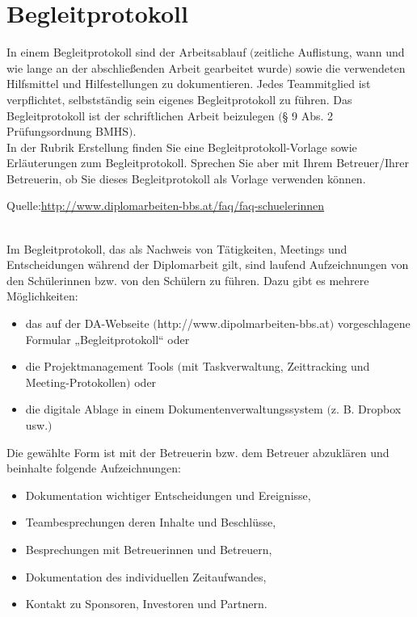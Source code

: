 
\chapter{Begleitprotokoll}
In einem Begleitprotokoll sind der Arbeitsablauf $($zeitliche Auflistung, wann und wie lange an der abschließenden Arbeit gearbeitet wurde$)$ sowie die verwendeten Hilfsmittel und Hilfestellungen zu dokumentieren. Jedes Teammitglied ist verpflichtet, selbstständig sein eigenes Begleitprotokoll zu führen. Das Begleitprotokoll ist der schriftlichen Arbeit beizulegen $($§ 9 Abs. 2 Prüfungsordnung BMHS$)$.
\\
\noindent In der Rubrik Erstellung finden Sie eine Begleitprotokoll-Vorlage sowie Erläuterungen zum Begleitprotokoll. Sprechen Sie aber mit Ihrem Betreuer/Ihrer Betreuerin, ob Sie dieses Begleitprotokoll als Vorlage verwenden können.\\
\begin{large} Quelle:\url{http://www.diplomarbeiten-bbs.at/faq/faq-schuelerinnen}
\end{large}
\\
\noindent
Im Begleitprotokoll, das als Nachweis von Tätigkeiten, Meetings und Entscheidungen während der Diplomarbeit gilt, sind laufend Aufzeichnungen von den Schülerinnen bzw. von den Schülern zu führen. 
Dazu gibt es mehrere Möglichkeiten: 
\begin{itemize}
	\item das auf der DA-Webseite $($http://www.dipolmarbeiten-bbs.at$)$ vorgeschlagene Formular „Begleitprotokoll“ oder 
	\item die Projektmanagement Tools $($mit Taskverwaltung, Zeittracking und Meeting-Protokollen$)$ oder 
	\item die digitale Ablage in einem Dokumentenverwaltungssystem $($z. B. Dropbox usw.$)$ 
\end{itemize}
Die gewählte Form ist mit der Betreuerin bzw. dem Betreuer abzuklären und beinhalte folgende Aufzeichnungen: 
\begin{itemize}
	\item Dokumentation wichtiger Entscheidungen und Ereignisse, 
	\item Teambesprechungen deren Inhalte und Beschlüsse, 
	\item Besprechungen mit Betreuerinnen und Betreuern, 
	\item Dokumentation des individuellen Zeitaufwandes, 
	\item Kontakt zu Sponsoren, Investoren und Partnern. 	
\end{itemize}
